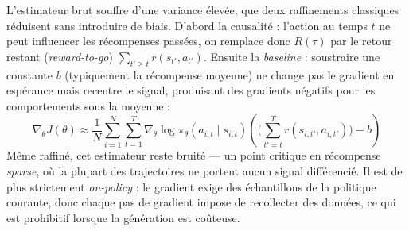 \documentclass[11pt,a4paper]{article}
\begin{document}
L'estimateur brut souffre d'une variance élevée, que deux raffinements classiques réduisent sans introduire de biais. D'abord la causalité : l'action au temps $t$ ne peut influencer les récompenses passées, on remplace donc $R(\tau)$ par le retour restant (\emph{reward-to-go}) $\sum_{t' \geq t} r(s_{t'}, a_{t'})$. Ensuite la \emph{baseline} : soustraire une constante $b$ (typiquement la récompense moyenne) ne change pas le gradient en espérance mais recentre le signal, produisant des gradients négatifs pour les comportements sous la moyenne :
\begin{equation}
\nabla_\theta J(\theta) \approx \frac{1}{N} \sum_{i=1}^{N} \sum_{t=1}^{T} \nabla_\theta \log \pi_\theta(a_{i,t} \mid s_{i,t}) \left( \Big( \sum_{t' = t}^{T} r(s_{i,t'}, a_{i,t'}) \Big) - b \right)
\label{eq:pg_baseline}
\end{equation}
Même raffiné, cet estimateur reste bruité — un point critique en récompense \emph{sparse}, où la plupart des trajectoires ne portent aucun signal différencié. Il est de plus strictement \emph{on-policy} : le gradient exige des échantillons de la politique courante, donc chaque pas de gradient impose de recollecter des données, ce qui est prohibitif lorsque la génération est coûteuse.

\end{document}
